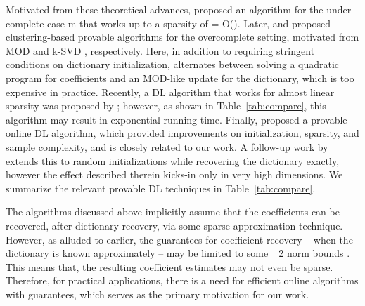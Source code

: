 \documentclass{article}
\def\[#1\]{{$#1$}}
\begin{document}
Motivated from these theoretical advances, \cite{Spielman2012} proposed an algorithm for the under-complete case \[n\geq m\] that works up-to a sparsity of \[k = O()\]. Later, \cite{Agarwal14} and \cite{Arora14} proposed clustering-based provable algorithms for the overcomplete setting, motivated from MOD  \citep{Engan1999} and k-SVD \citep{Aharon2006}, respectively. 
Here, in addition to requiring stringent conditions on dictionary initialization, \cite{Agarwal14} alternates between solving a quadratic program for coefficients and an MOD-like \citep{Engan1999} update for the dictionary, which is too expensive in practice. Recently, a DL algorithm that works for almost linear sparsity was proposed by \cite{Barak2015}; however, as shown in Table~\ref{tab:compare}, this algorithm may result in exponential running time. Finally, \cite{Arora15} proposed a provable online DL algorithm, which provided improvements on initialization, sparsity, and sample complexity, and is closely related to our work. A follow-up work by \cite{Chatterji2017} extends this to random initializations while recovering the dictionary exactly, however the effect described therein kicks-in only in very high dimensions. We summarize the relevant provable DL techniques in Table~\ref{tab:compare}.

The algorithms discussed above implicitly assume that the coefficients can be recovered, after dictionary recovery, via some sparse approximation technique.  However, as alluded to earlier, the guarantees for coefficient recovery -- when the dictionary is known approximately -- may be limited to some \[\ell_2\] norm bounds \citep{Donoho2006}. This means that, the resulting coefficient estimates may not even be sparse.  Therefore, for practical applications, there is a need for efficient online algorithms with guarantees, which serves as the primary motivation for our work.
\end{document}
